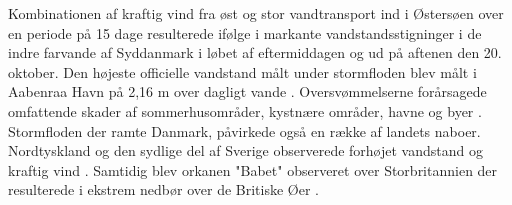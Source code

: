 Kombinationen af kraftig vind fra øst og stor vandtransport ind i Østersøen over en periode på 15 dage resulterede ifølge \cite{kystdirektoratet_stormflod2023} i markante vandstandsstigninger i de indre farvande af Syddanmark i løbet af eftermiddagen og ud på aftenen den 20. oktober. Den højeste officielle vandstand målt under stormfloden blev målt i Aabenraa Havn på 2,16 m over dagligt vande \citep{damberg_vaerste_2023}. Oversvømmelserne forårsagede omfattende skader af sommerhusområder, kystnære områder, havne og byer \citep{kystdirektoratet_stormflod2023, naturskaderadet_anmeldelser_2023}. \\
Stormfloden der ramte Danmark, påvirkede også en række af landets naboer. Nordtyskland og den sydlige del af Sverige observerede forhøjet vandstand og kraftig vind \citep{kiesel_brief_2024}. Samtidig blev orkanen "Babet"\hspace{0.1cm} observeret over Storbritannien der resulterede i ekstrem nedbør over de Britiske Øer \citep{met_office_storm_2023}.  




